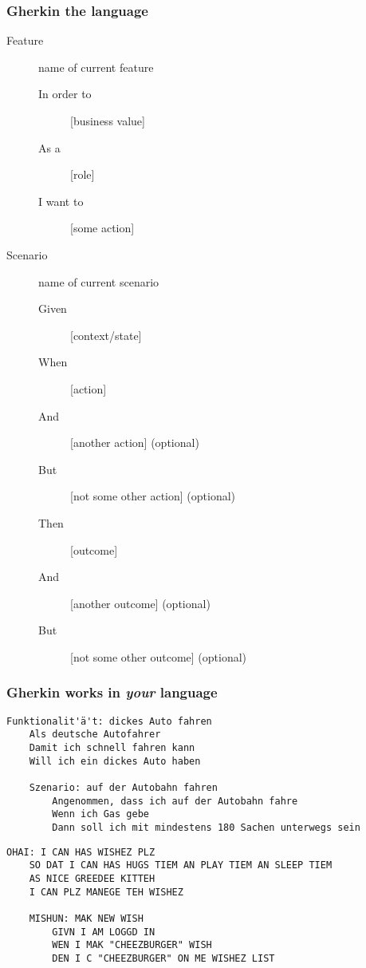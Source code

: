 \documentclass[10pt]{vcs_beamer}
\begin{document}
\begin{frame}
\frametitle{Gherkin the language}
\begin{description}
    \item[Feature] name of current feature
        \begin{description}
            \item[In order to] [business value]
            \item[As a] [role]
            \item[I want to] [some action]
        \end{description}
\end{description}

\begin{description}
    \item[Scenario] name of current scenario
        \begin{description}
            \item[Given] [context/state]
            \item[When] [action]
            \item[And] [another action] (optional)
            \item[But] [not some other action] (optional)
            \item[Then] [outcome]
            \item[And] [another outcome] (optional)
            \item[But] [not some other outcome] (optional)
        \end{description}
\end{description}
\end{frame}

\begin{frame}[fragile]
\frametitle{Gherkin works in \emph{your} language}

\begin{lstlisting}[escapeinside='']
Funktionalit'ä't: dickes Auto fahren
    Als deutsche Autofahrer
    Damit ich schnell fahren kann
    Will ich ein dickes Auto haben

    Szenario: auf der Autobahn fahren
        Angenommen, dass ich auf der Autobahn fahre
        Wenn ich Gas gebe
        Dann soll ich mit mindestens 180 Sachen unterwegs sein
\end{lstlisting}


\begin{lstlisting}
OHAI: I CAN HAS WISHEZ PLZ
    SO DAT I CAN HAS HUGS TIEM AN PLAY TIEM AN SLEEP TIEM
    AS NICE GREEDEE KITTEH
    I CAN PLZ MANEGE TEH WISHEZ

    MISHUN: MAK NEW WISH
        GIVN I AM LOGGD IN
        WEN I MAK "CHEEZBURGER" WISH
        DEN I C "CHEEZBURGER" ON ME WISHEZ LIST
\end{lstlisting}

\end{frame}
\end{document}
